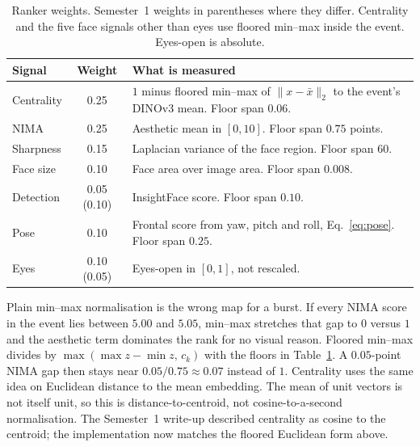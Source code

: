\documentclass[conference]{IEEEtran}
\begin{document}
\begin{table}[t]
\caption{Ranker weights. Semester~1 weights in parentheses where they differ.
Centrality and the five face signals other than eyes use floored min--max
inside the event. Eyes-open is absolute.}
\label{tab:weights}
\centering
\scriptsize
\begin{tabular}{@{}lcp{4.15cm}@{}}
\toprule
Signal & Weight & What is measured \\
\midrule
Centrality & 0.25 & $1$ minus floored min--max of
$\lVert x - \bar{x}\rVert_2$ to the event's \mbox{DINOv3} mean.
Floor span $0.06$. \\
NIMA & 0.25 & Aesthetic mean in $[0,10]$. Floor span $0.75$ points. \\
Sharpness & 0.15 & Laplacian variance of the face region.
Floor span $60$. \\
Face size & 0.10 & Face area over image area. Floor span $0.008$. \\
Detection & 0.05 {\scriptsize(0.10)} & InsightFace score. Floor span $0.10$. \\
Pose & 0.10 & Frontal score from yaw, pitch and roll,
Eq.~\eqref{eq:pose}. Floor span $0.25$. \\
Eyes & 0.10 {\scriptsize(0.05)} & Eyes-open in $[0,1]$, not rescaled.
\\
\bottomrule
\end{tabular}
\end{table}

Plain min--max normalisation is the wrong map for a burst. If every NIMA score
in the event lies between $5.00$ and $5.05$, min--max stretches that gap to
$0$ versus $1$ and the aesthetic term dominates the rank for no visual reason.
Floored min--max divides by $\max(\max z - \min z,\, c_k)$ with the floors in
Table~\ref{tab:weights}. A $0.05$-point NIMA gap then stays near
$0.05/0.75\approx 0.07$ instead of $1$. Centrality uses the same idea on
Euclidean distance to the mean embedding. The mean of unit vectors is not
itself unit, so this is distance-to-centroid, not cosine-to-a-second
normalisation. The Semester~1 write-up described centrality as cosine to the
centroid; the implementation now matches the floored Euclidean form above.
\end{document}
